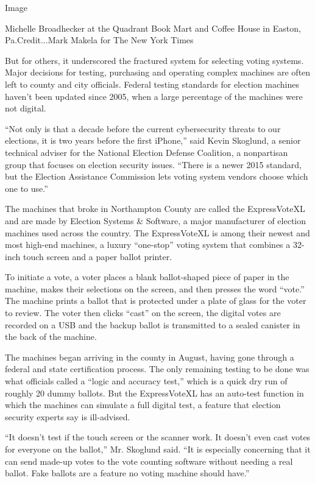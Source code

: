 Image

Michelle Broadhecker at the Quadrant Book Mart and Coffee House in
Easton, Pa.Credit...Mark Makela for The New York Times

But for others, it underscored the fractured system for selecting voting
systems. Major decisions for testing, purchasing and operating complex
machines are often left to county and city officials. Federal testing
standards for election machines haven't been updated since 2005, when a
large percentage of the machines were not digital.

``Not only is that a decade before the current cybersecurity threats to
our elections, it is two years before the first iPhone,'' said Kevin
Skoglund, a senior technical adviser for the National Election Defense
Coalition, a nonpartisan group that focuses on election security issues.
``There is a newer 2015 standard, but the Election Assistance Commission
lets voting system vendors choose which one to use.''

The machines that broke in Northampton County are called the
ExpressVoteXL and are made by Election Systems \& Software, a major
manufacturer of election machines used across the country. The
ExpressVoteXL is among their newest and most high-end machines, a luxury
``one-stop'' voting system that combines a 32-inch touch screen and a
paper ballot printer.

To initiate a vote, a voter places a blank ballot-shaped piece of paper
in the machine, makes their selections on the screen, and then presses
the word ``vote.'' The machine prints a ballot that is protected under a
plate of glass for the voter to review. The voter then clicks ``cast''
on the screen, the digital votes are recorded on a USB and the backup
ballot is transmitted to a sealed canister in the back of the machine.

The machines began arriving in the county in August, having gone through
a federal and state certification process. The only remaining testing to
be done was what officials called a ``logic and accuracy test,'' which
is a quick dry run of roughly 20 dummy ballots. But the ExpressVoteXL
has an auto-test function in which the machines can simulate a full
digital test, a feature that election security experts say is
ill-advised.

``It doesn't test if the touch screen or the scanner work. It doesn't
even cast votes for everyone on the ballot,'' Mr. Skoglund said. ``It is
especially concerning that it can send made-up votes to the vote
counting software without needing a real ballot. Fake ballots are a
feature no voting machine should have.''

